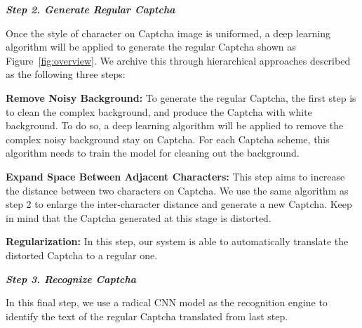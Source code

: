 \noindent \textbf{\emph{Step 2. Generate Regular Captcha}}

Once the style of character on Captcha image is uniformed, a deep learning algorithm will be applied to generate the regular Captcha shown as Figure~\ref{fig:overview}. We archive this through hierarchical approaches described as the following three steps:

\noindent \circling{\textcolor{white}{1}} \textbf{Remove Noisy Background:}  To generate the regular Captcha, the first step is to clean the complex background, and produce the Captcha with white background.
To do so, a deep learning algorithm will be applied to remove the complex noisy background stay on Captcha.
For each Captcha scheme, this algorithm needs to train the model for cleaning out the background.

\noindent \circling{\textcolor{white}{2}} \textbf{Expand Space Between Adjacent Characters:} This step aims to increase the distance between two characters on Captcha. We use the same algorithm as step 2 to enlarge the inter-character distance and generate a new Captcha. Keep in mind that the Captcha generated at this stage is distorted.

\noindent \circling{\textcolor{white}{3}} \textbf{Regularization:} In this step, our system is able to automatically translate the distorted Captcha to a regular one.

\noindent \textbf{\emph{Step 3. Recognize Captcha}}

In this final step, we use a radical CNN model as the recognition engine to identify the text of the regular Captcha translated from last step.



